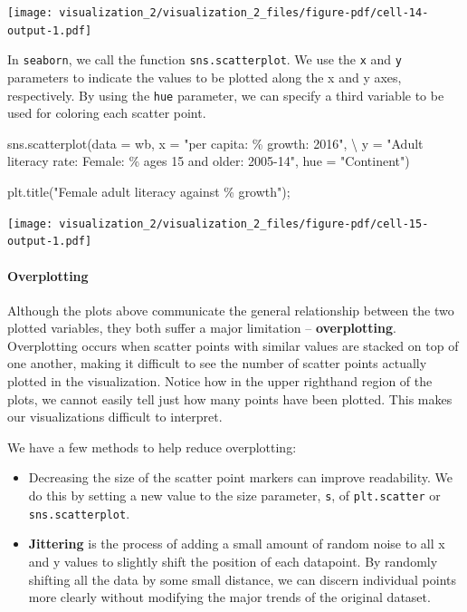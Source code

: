 \documentclass[
  letterpaper,
  DIV=11,
  numbers=noendperiod]{scrreprt}
\let\oldparagraph\paragraph
\renewcommand{\paragraph}[1]{\oldparagraph{#1}\mbox{}}
\newenvironment{Shaded}{\begin{snugshade}}{\end{snugshade}}
\newcommand{\NormalTok}[1]{\textcolor[rgb]{0.00,0.23,0.31}{#1}}
\newcommand{\OperatorTok}[1]{\textcolor[rgb]{0.37,0.37,0.37}{#1}}
\newcommand{\SpecialCharTok}[1]{\textcolor[rgb]{0.37,0.37,0.37}{#1}}
\newcommand{\StringTok}[1]{\textcolor[rgb]{0.13,0.47,0.30}{#1}}
\providecommand{\tightlist}{%
  \setlength{\itemsep}{0pt}\setlength{\parskip}{0pt}}\usepackage{longtable,booktabs,array}
\begin{document}
\texttt{[image: visualization\_2/visualization\_2\_files/figure-pdf/cell-14-output-1.pdf]}

In \texttt{seaborn}, we call the function \texttt{sns.scatterplot}. We
use the \texttt{x} and \texttt{y} parameters to indicate the values to
be plotted along the x and y axes, respectively. By using the
\texttt{hue} parameter, we can specify a third variable to be used for
coloring each scatter point.

\begin{Shaded}
\begin{Highlighting}[]
\NormalTok{sns.scatterplot(data }\OperatorTok{=}\NormalTok{ wb, x }\OperatorTok{=} \StringTok{"per capita: }\SpecialCharTok{\% g}\StringTok{rowth: 2016"}\NormalTok{, }\OperatorTok{\textbackslash{}}
\NormalTok{               y }\OperatorTok{=} \StringTok{"Adult literacy rate: Female: \% ages 15 and older: 2005{-}14"}\NormalTok{, }
\NormalTok{               hue }\OperatorTok{=} \StringTok{"Continent"}\NormalTok{)}

\NormalTok{plt.title(}\StringTok{"Female adult literacy against }\SpecialCharTok{\% g}\StringTok{rowth"}\NormalTok{)}\OperatorTok{;}
\end{Highlighting}
\end{Shaded}

\texttt{[image: visualization\_2/visualization\_2\_files/figure-pdf/cell-15-output-1.pdf]}

\paragraph{Overplotting}\label{overplotting}

Although the plots above communicate the general relationship between
the two plotted variables, they both suffer a major limitation --
\textbf{overplotting}. Overplotting occurs when scatter points with
similar values are stacked on top of one another, making it difficult to
see the number of scatter points actually plotted in the visualization.
Notice how in the upper righthand region of the plots, we cannot easily
tell just how many points have been plotted. This makes our
visualizations difficult to interpret.

We have a few methods to help reduce overplotting:

\begin{itemize}
\tightlist
\item
  Decreasing the size of the scatter point markers can improve
  readability. We do this by setting a new value to the size parameter,
  \texttt{s}, of \texttt{plt.scatter} or \texttt{sns.scatterplot}.
\item
  \textbf{Jittering} is the process of adding a small amount of random
  noise to all x and y values to slightly shift the position of each
  datapoint. By randomly shifting all the data by some small distance,
  we can discern individual points more clearly without modifying the
  major trends of the original dataset.
\end{itemize}
\end{document}
